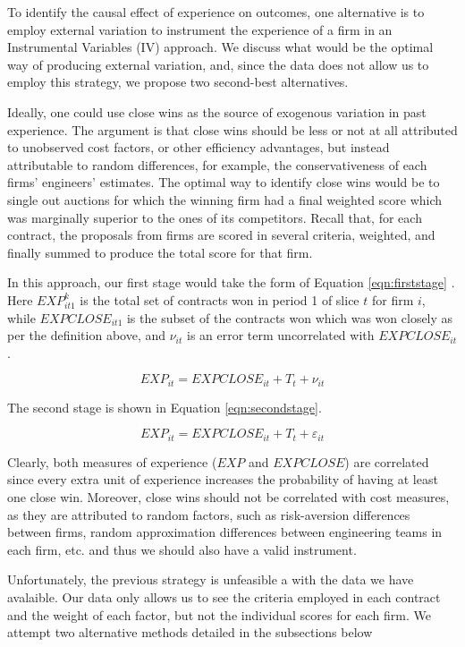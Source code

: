 To identify the causal effect of experience on outcomes, one alternative is to employ external variation to instrument the experience of a firm in an Instrumental Variables (IV) approach. We discuss what would be the optimal way of producing external variation, and, since the data does not allow us to employ this strategy, we propose two second-best alternatives.

Ideally, one could use close wins as the source of exogenous variation in past experience. The argument is that close wins should be less or not at all attributed to unobserved cost factors, or other efficiency advantages, but instead attributable to random differences, for example, the conservativeness of each firms' engineers' estimates. The optimal way to identify close wins would be to single out auctions for which the winning firm had a final weighted score which was marginally superior to the ones of its competitors.  Recall that, for each contract, the  proposals from firms are scored in several criteria, weighted, and finally summed to produce the total score for that firm.

In this approach, our first stage would take the form of Equation \ref{eqn:firststage} . Here $EXP_{it1}^k$ is the total set of contracts won in period 1 of slice $t$ for firm $i$, while $EXPCLOSE_{it1}$ is the subset of the contracts won which was won closely as per the definition above, and $\nu_{it}$ is an error term uncorrelated with $EXPCLOSE_{it}$.

\begin{equation}
\label{eqn:firststage}
EXP_{it}= EXPCLOSE_{it}+T_t+\nu_{it}
\end{equation}

The second stage is shown in Equation \ref{eqn:secondstage}.

\begin{equation}
\label{eqn:secondstage}
EXP_{it}= EXPCLOSE_{it}+T_t+\varepsilon_{it}
\end{equation}

Clearly, both measures of experience ($EXP$ and $EXPCLOSE$) are correlated since every extra unit of experience increases the probability of having at least one close win. Moreover, close wins should not be correlated with cost measures, as they are attributed to random factors, such as risk-aversion differences between firms, random approximation differences between engineering teams in each firm, etc. and thus we should also have a valid instrument.

Unfortunately, the previous strategy is unfeasible a with the data we have avalaible. Our data only allows us to see the criteria employed in each contract and the weight of each factor, but not the individual scores for each firm. We attempt two alternative methods detailed in the subsections below

